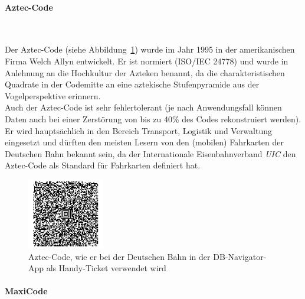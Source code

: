 \paragraph{Aztec-Code}~

Der Aztec-Code (siehe Abbildung~\ref{fig:aztec}) wurde im Jahr 1995 in der amerikanischen Firma Welch Allyn entwickelt.
Er ist normiert (ISO/IEC 24778) und wurde in Anlehnung an die Hochkultur der Azteken benannt, 
da die charakteristischen Quadrate in der Codemitte an eine aztekische Stufenpyramide aus der Vogelperspektive erinnern.\\ 

Auch der Aztec-Code ist sehr fehlertolerant (je nach Anwendungsfall können Daten auch bei einer Zerstörung von bis zu 40\% des Codes rekonstruiert werden). Er wird hauptsächlich in den Bereich Transport, Logistik und Verwaltung eingesetzt und dürften den meisten Lesern von den (mobilen) Fahrkarten der Deutschen Bahn bekannt sein, da der Internationale Eisenbahnverband \textit{UIC} den Aztec-Code als Standard für Fahrkarten definiert hat.\\

\begin{figure}[htbp]%
	\centering
	\includegraphics[width=0.3\textwidth]{Bilder/Aztec_Code.png} 
	\caption[Aztec-Code]{Aztec-Code, wie er bei der Deutschen Bahn in der DB-Navigator-App als Handy-Ticket verwendet wird\footnotemark}
	\label{fig:aztec}	
\end{figure}

\paragraph{MaxiCode}~

